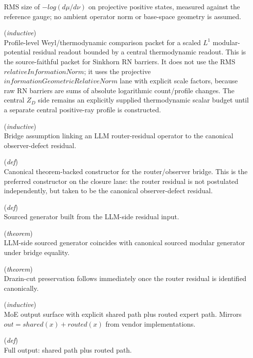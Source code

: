 \documentclass[11pt,a4paper]{article}
\begin{document}
\begin{description}
RMS size of $-log(d\mu  / d\nu )$ on projective positive states, measured against the 
reference gauge; no ambient operator norm or base-space geometry is assumed.
  \item[\texttt{WeylThermodynamicProfileComparison}] (\textit{inductive}) \\ Profile-level Weyl/thermodynamic comparison packet for a scaled $L^1 $ 
modular-potential residual readout bounded by a central thermodynamic readout. 
This is the source-faithful packet for Sinkhorn RN barriers. It does not use 
the RMS $relativeInformationNorm$; it uses the projective 
$informationGeometricRelativeNorm$ lane with explicit scale factors, because 
raw RN barriers are sums of absolute logarithmic count/profile changes. The 
central $Z_D$ side remains an explicitly supplied thermodynamic scalar budget 
until a separate central positive-ray profile is constructed.
  \item[\texttt{RouterDefectBridge}] (\textit{inductive}) \\ Bridge assumption linking an LLM router-residual operator to the canonical observer-defect residual.
  \item[\texttt{ofCanonicalObserverDefect}] (\textit{def}) \\ Canonical theorem-backed constructor for the router/observer bridge. 
This is the preferred constructor on the closure lane: the router residual is not 
postulated independently, but taken to be the canonical observer-defect residual.
  \item[\texttt{sourcedGenerator}] (\textit{def}) \\ Sourced generator built from the LLM-side residual input.
  \item[\texttt{sourcedGenerator\_eq\_canonical}] (\textit{theorem}) \\ LLM-side sourced generator coincides with canonical sourced modular generator under bridge equality.
  \item[\texttt{sourcedGenerator\_respects\_cut}] (\textit{theorem}) \\ Drazin-cut preservation follows immediately once the router residual is identified canonically.
  \item[\texttt{SharedRoutedMoEBlock}] (\textit{inductive}) \\ MoE output surface with explicit shared path plus routed expert path. 
Mirrors $out = shared(x) + routed(x)$ from vendor implementations.
  \item[\texttt{output}] (\textit{def}) \\ Full output: shared path plus routed path.

\end{description}
\end{document}
